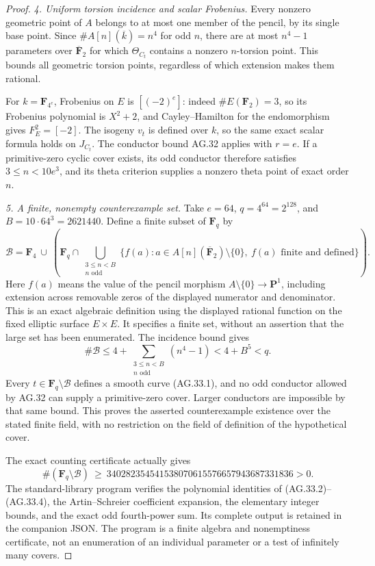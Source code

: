 \begin{proof}
\emph{4. Uniform torsion incidence and scalar Frobenius.}
Every nonzero geometric point of $A$ belongs to at most
one member of the pencil, by its single base point.
Since $\#A[n](\overline k)=n^4$ for odd $n$, there are
at most $n^4-1$ parameters over $\overline{\mathbf F}_2$
for which $\Theta_{C_t}$ contains a nonzero $n$-torsion point.
This bounds all geometric torsion points, regardless of
which extension makes them rational.

For $k=\mathbf F_{4^e}$, Frobenius on $E$ is $[(-2)^e]$:
indeed $\#E(\mathbf F_2)=3$, so its Frobenius
polynomial is $X^2+2$, and Cayley--Hamilton for the
endomorphism gives $F_E^2=[-2]$.
The isogeny $v_t$ is defined over $k$, so the same exact
scalar formula holds on $J_{C_t}$. The conductor bound
AG.32 applies with $r=e$. If a primitive-zero cyclic cover
exists, its odd conductor therefore satisfies $3\le n<10e^3$,
and its theta criterion supplies a nonzero theta point
of exact order $n$.

\emph{5. A finite, nonempty counterexample set.}
Take $e=64$, $q=4^{64}=2^{128}$, and $B=10\cdot64^3=2621440$.
Define a finite subset of $\mathbf F_q$ by
\[
 \mathcal B=\mathbf F_4\ \cup\
 \left(\mathbf F_q\cap
 \bigcup_{\substack{3\le n<B\\ n\text{ odd}}}
 \{f(a):a\in A[n](\overline{\mathbf F}_2)\setminus\{0\},
                         \ f(a)\text{ finite and defined}\}\right).
                                                               \tag{AG.33.6}
\]
Here $f(a)$ means the value of the pencil morphism
$A\setminus\{0\}\to\mathbf P^1$, including extension across
removable zeros of the displayed numerator and denominator.
This is an exact algebraic definition using the displayed
rational function on the fixed elliptic surface $E\times E$.
It specifies a finite set, without an assertion that the
large set has been enumerated. The incidence bound gives
\[
 \#\mathcal B\le4+
       \sum_{\substack{3\le n<B\\ n\text{ odd}}}(n^4-1)<4+B^5<q.
\]
Every $t\in\mathbf F_q\setminus\mathcal B$ defines a
smooth curve (AG.33.1), and no odd conductor allowed by
AG.32 can supply a primitive-zero cover. Larger conductors
are impossible by that same bound. This proves the
asserted counterexample existence over the stated finite
field, with no restriction on the field of definition of
the hypothetical cover.

The exact counting certificate actually gives
\[
 \#(\mathbf F_q\setminus\mathcal B)\ \ge\
       340282354541538070615576657943687331836>0.
\]
The standard-library program
verifies the polynomial identities of (AG.33.2)--(AG.33.4),
the Artin--Schreier coefficient expansion, the elementary
integer bounds, and the exact odd fourth-power sum.
Its complete output is retained in the companion JSON.
The program is a finite algebra and nonemptiness certificate,
not an enumeration of an individual parameter or a test
of infinitely many covers.


\end{proof}
